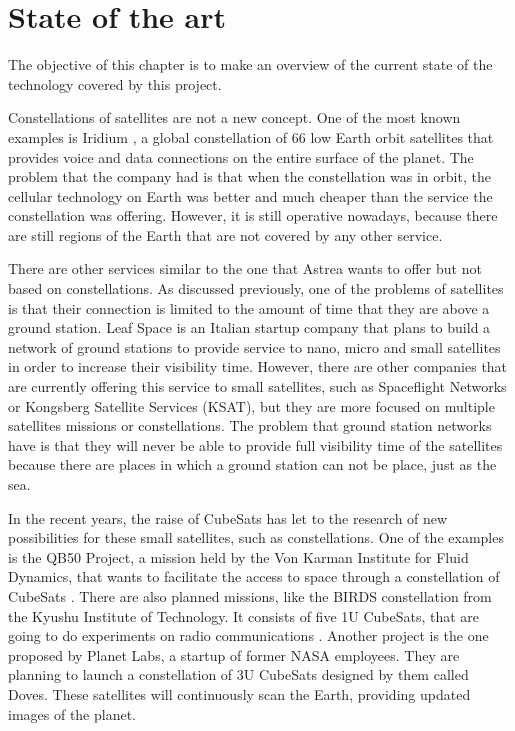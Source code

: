 \chapter{State of the art}
The objective of this chapter is to make an overview of the current state of the technology covered by this project. 

Constellations of satellites are not a new concept. One of the most known examples is Iridium \cite{Iridium}, a global constellation of 66 low Earth orbit satellites that provides voice and data connections on the entire surface of the planet. The problem that the company had is that when the constellation was in orbit, the cellular technology on Earth was better and much cheaper than the service the constellation was offering. However, it is still operative nowadays, because there are still regions of the Earth that are not covered by any other service.

There are other services similar to the one that Astrea wants to offer but not based on constellations. As discussed previously, one of the problems of satellites is that their connection is limited to the amount of time that they are above a ground station. Leaf Space is an Italian startup company that plans to build a network of ground stations to provide service to nano, micro and small satellites in order to increase their visibility time. However, there are other companies that are currently offering this service to small satellites, such as Spaceflight Networks or Kongsberg Satellite Services (KSAT), but they are more focused on multiple satellites missions or constellations. The problem that ground station networks have is that they will never be able to provide full visibility time of the satellites because there are places in which a ground station can not be place, just as the sea.

In the recent years, the raise of CubeSats has let to the research of new possibilities for these small satellites, such as constellations. One of the examples is the QB50 Project, a mission held by the Von Karman Institute for Fluid Dynamics, that wants to facilitate the access to space through a constellation of CubeSats \cite{qb50}. There are also planned missions, like the BIRDS constellation from the Kyushu Institute of Technology. It consists of five 1U CubeSats, that are going to do experiments on radio communications \cite{KyushuInstituteofTechnology2017}. Another project is the one proposed by Planet Labs, a startup of former NASA employees. They are planning to launch a constellation of 3U CubeSats designed by them called Doves. These satellites will continuously scan the Earth, providing updated images of the planet.

